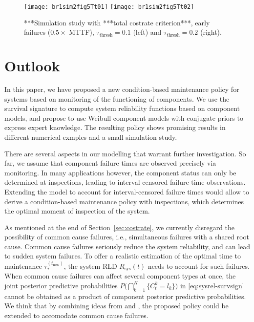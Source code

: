 \documentclass[authoryear]{elsarticle}
\newcommand{\Rsys}{R_\text{sys}}
\def\tnow{t_\text{now}}
\newcommand{\tausnow}{\tau_*^{(\tnow)}}
\newcommand{\tthresh}{\tau_{\text{thresh}}}
\begin{document}
\begin{figure}
\texttt{[image: br1sim2fig5Tt01]}
\texttt{[image: br1sim2fig5Tt02]}
\caption{***Simulation study with ***total costrate criterion***, early failures ($0.5 \times$ MTTF),
$\tthresh = 0.1$ (left) and $\tthresh = 0.2$ (right).}
\label{fig:simtotalcostrate0102}
\end{figure}
\fi


\section{Outlook}
\label{sec:outlook}

In this paper, we have proposed a new condition-based maintenance policy
for systems based on monitoring of the functioning of components.
We use the survival signature to compute system reliability functions
based on component models, and propose to use Weibull component models
with conjugate priors to express expert knowledge.
The resulting policy shows promising results in
different numerical exmples and a small simulation study.

There are several aspects in our modelling that warrant further investigation.
So far, we assume that component failure times are observed precisely via monitoring.
In many applications however, the component status can only be determined
at inspections, leading to interval-censored failure time observations.
Extending the model to account for interval-censored failure times
would allow to derive a condition-based maintenance policy with inspections,
which determines the optimal moment of inspection of the system.

As mentioned at the end of Section~\ref{sec:costrate},
we currently disregard the possibility of common cause failures,
i.e., simultaneous failures with a shared root cause.
Common cause failures seriously reduce the system reliability,
and can lead to sudden system failures.
To offer a realistic estimation of the optimal time to maintenance $\tausnow$,
the system RLD $\Rsys(t)$ needs to account for such failures.
When common cause failures can affect several component types at once,
the joint posterior predictive probabilities $P\Big( \bigcap_{k=1}^K \{ C^k_t = l_k\} \Big)$ in \eqref{eq:sysrel-survsign}
cannot be obtained as a product of component posterior predictive probabilities.
We think that by combining ideas from \cite{2015:coolen-coolen-maturi} and \cite{Troffaes2014a},
the proposed policy could be extended to accomodate common cause failures.
\end{document}
